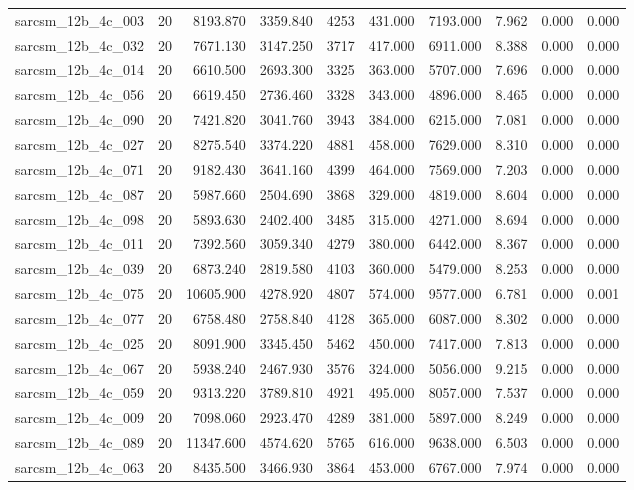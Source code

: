 \begin{tabular}{lrrrrrrrrr}
sarcsm\_12b\_4c\_003 & 20 & 8193.870 & 3359.840 & 4253 & 431.000 & 7193.000 & 7.962 & 0.000 & 0.000 \\
sarcsm\_12b\_4c\_032 & 20 & 7671.130 & 3147.250 & 3717 & 417.000 & 6911.000 & 8.388 & 0.000 & 0.000 \\
sarcsm\_12b\_4c\_014 & 20 & 6610.500 & 2693.300 & 3325 & 363.000 & 5707.000 & 7.696 & 0.000 & 0.000 \\
sarcsm\_12b\_4c\_056 & 20 & 6619.450 & 2736.460 & 3328 & 343.000 & 4896.000 & 8.465 & 0.000 & 0.000 \\
sarcsm\_12b\_4c\_090 & 20 & 7421.820 & 3041.760 & 3943 & 384.000 & 6215.000 & 7.081 & 0.000 & 0.000 \\
sarcsm\_12b\_4c\_027 & 20 & 8275.540 & 3374.220 & 4881 & 458.000 & 7629.000 & 8.310 & 0.000 & 0.000 \\
sarcsm\_12b\_4c\_071 & 20 & 9182.430 & 3641.160 & 4399 & 464.000 & 7569.000 & 7.203 & 0.000 & 0.000 \\
sarcsm\_12b\_4c\_087 & 20 & 5987.660 & 2504.690 & 3868 & 329.000 & 4819.000 & 8.604 & 0.000 & 0.000 \\
sarcsm\_12b\_4c\_098 & 20 & 5893.630 & 2402.400 & 3485 & 315.000 & 4271.000 & 8.694 & 0.000 & 0.000 \\
sarcsm\_12b\_4c\_011 & 20 & 7392.560 & 3059.340 & 4279 & 380.000 & 6442.000 & 8.367 & 0.000 & 0.000 \\
sarcsm\_12b\_4c\_039 & 20 & 6873.240 & 2819.580 & 4103 & 360.000 & 5479.000 & 8.253 & 0.000 & 0.000 \\
sarcsm\_12b\_4c\_075 & 20 & 10605.900 & 4278.920 & 4807 & 574.000 & 9577.000 & 6.781 & 0.000 & 0.001 \\
sarcsm\_12b\_4c\_077 & 20 & 6758.480 & 2758.840 & 4128 & 365.000 & 6087.000 & 8.302 & 0.000 & 0.000 \\
sarcsm\_12b\_4c\_025 & 20 & 8091.900 & 3345.450 & 5462 & 450.000 & 7417.000 & 7.813 & 0.000 & 0.000 \\
sarcsm\_12b\_4c\_067 & 20 & 5938.240 & 2467.930 & 3576 & 324.000 & 5056.000 & 9.215 & 0.000 & 0.000 \\
sarcsm\_12b\_4c\_059 & 20 & 9313.220 & 3789.810 & 4921 & 495.000 & 8057.000 & 7.537 & 0.000 & 0.000 \\
sarcsm\_12b\_4c\_009 & 20 & 7098.060 & 2923.470 & 4289 & 381.000 & 5897.000 & 8.249 & 0.000 & 0.000 \\
sarcsm\_12b\_4c\_089 & 20 & 11347.600 & 4574.620 & 5765 & 616.000 & 9638.000 & 6.503 & 0.000 & 0.000 \\
sarcsm\_12b\_4c\_063 & 20 & 8435.500 & 3466.930 & 3864 & 453.000 & 6767.000 & 7.974 & 0.000 & 0.000 \\

\end{tabular}
